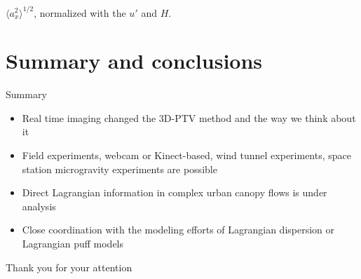 \documentclass[aspectratio=43]{beamer}
\begin{document}
\begin{frame}[label=result-3]
\centering{}
\begin{cardTiny} $\langle a_x^2 \rangle^{1/2}$, normalized with the $u'$ and $H$.\end{cardTiny}
%
\end{frame}

%



\section{Summary and conclusions}\label{sec:summary}

\begin{frame}{Summary}
\begin{itemize}
\item Real time imaging changed the 3D-PTV method and the way we think about it
\item Field experiments, webcam or Kinect-based, wind tunnel experiments, space station microgravity experiments are possible
\item Direct Lagrangian information in complex urban canopy flows is under analysis
\item Close coordination with the modeling efforts of Lagrangian dispersion or Lagrangian puff models
\end{itemize}
\end{frame}

\begin{frame}{Thank you for your attention}
\end{frame}
\end{document}

